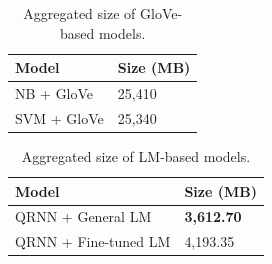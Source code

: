 \documentclass[a4paper,twoside,phd]{BYUPhys}
\begin{document}
\begin{table}[H]
	\centering
	
	\begin{tabular}{|p{4.2cm}|p{5cm}|}
		\hline
		
		\textbf{Model} & \textbf{Size (MB)}                                                                                                                                                                                                                                                                                                                                                    \\
		\hline                                                                                                                                              
		NB + GloVe & 25,410 \\
		\hline
		
		SVM + GloVe & 25,340 \\
		\hline

		
	\end{tabular}
	\caption{Aggregated size of GloVe-based models.}
	\label{table:PreTrainedStorageRequirements}
\end{table}

\begin{table}[H]
	\centering
	
	\begin{tabular}{|p{4.2cm}|p{5cm}|}
		\hline
		
		\textbf{Model} & \textbf{Size (MB)}                                                                                                                                                                                                                                                                                                                                                    \\
		\hline                                                                                                                                              
		QRNN + \newline General LM  & \textbf{3,612.70}  \\
		\hline
		
		QRNN + \newline Fine-tuned LM  & 4,193.35  \\
		\hline
		
		
	\end{tabular}
	\caption{Aggregated size of LM-based models.}
	\label{table:LMStorageRequirements}
\end{table}
\end{document}
